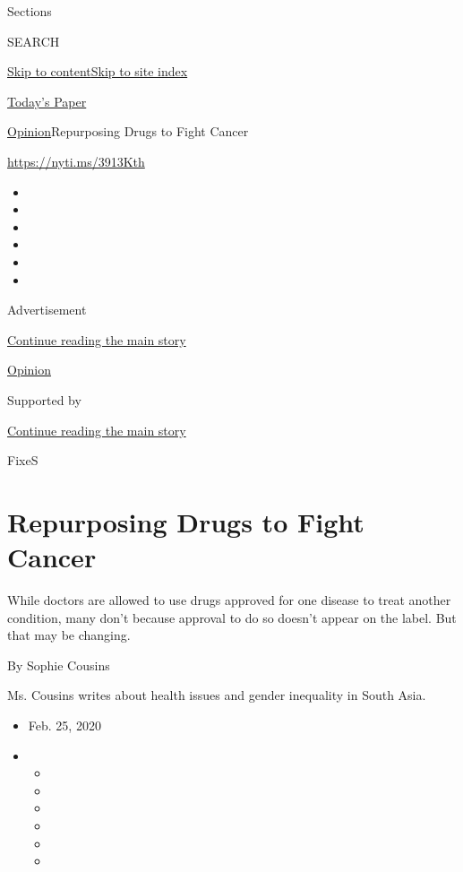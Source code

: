 Sections

SEARCH

\protect\hyperlink{site-content}{Skip to
content}\protect\hyperlink{site-index}{Skip to site index}

\href{https://myaccount.nytimes3xbfgragh.onion/auth/login?response_type=cookie\&client_id=vi}{}

\href{https://www.nytimes3xbfgragh.onion/section/todayspaper}{Today's
Paper}

\href{/section/opinion}{Opinion}\textbar{}Repurposing Drugs to Fight
Cancer

\url{https://nyti.ms/3913Kth}

\begin{itemize}
\item
\item
\item
\item
\item
\item
\end{itemize}

Advertisement

\protect\hyperlink{after-top}{Continue reading the main story}

\href{/section/opinion}{Opinion}

Supported by

\protect\hyperlink{after-sponsor}{Continue reading the main story}

FixeS

\hypertarget{repurposing-drugs-to-fight-cancer}{%
\section{Repurposing Drugs to Fight
Cancer}\label{repurposing-drugs-to-fight-cancer}}

While doctors are allowed to use drugs approved for one disease to treat
another condition, many don't because approval to do so doesn't appear
on the label. But that may be changing.

By Sophie Cousins

Ms. Cousins writes about health issues and gender inequality in South
Asia.

\begin{itemize}
\item
  Feb. 25, 2020
\item
  \begin{itemize}
  \item
  \item
  \item
  \item
  \item
  \item
  \end{itemize}
\end{itemize}

